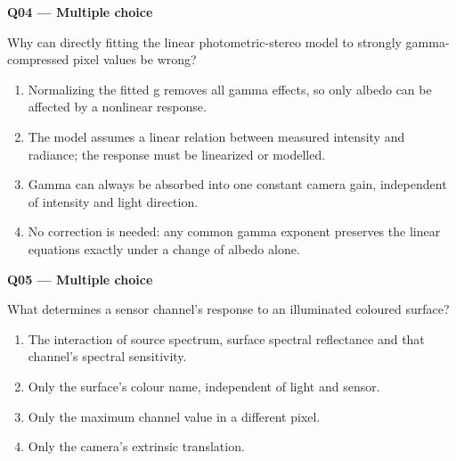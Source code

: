\documentclass[11pt,a4paper]{article}
\begin{document}
\par\vspace{12pt}
\begin{minipage}{\linewidth}
\textbf{Q04 — Multiple choice}\par\smallskip
Why can directly fitting the linear photometric-stereo model to strongly gamma-compressed pixel values be wrong?
\begin{enumerate}[label=\textbf{\Alph*.}]
\item Normalizing the fitted g removes all gamma effects,\allowbreak{} so only albedo can be affected by a nonlinear response.
\item The model assumes a linear relation between measured intensity and radiance; the response must be linearized or modelled.
\item Gamma can always be absorbed into one constant camera gain,\allowbreak{} independent of intensity and light direction.
\item No correction is needed: any common gamma exponent preserves the linear equations exactly under a change of albedo alone.
\end{enumerate}
\end{minipage}
\par\vspace{12pt}
\begin{minipage}{\linewidth}
\textbf{Q05 — Multiple choice}\par\smallskip
What determines a sensor channel's response to an illuminated coloured surface?
\begin{enumerate}[label=\textbf{\Alph*.}]
\item The interaction of source spectrum,\allowbreak{} surface spectral reflectance and that channel's spectral sensitivity.
\item Only the surface's colour name,\allowbreak{} independent of light and sensor.
\item Only the maximum channel value in a different pixel.
\item Only the camera's extrinsic translation.
\end{enumerate}
\end{minipage}
\par\vspace{12pt}
\end{document}
